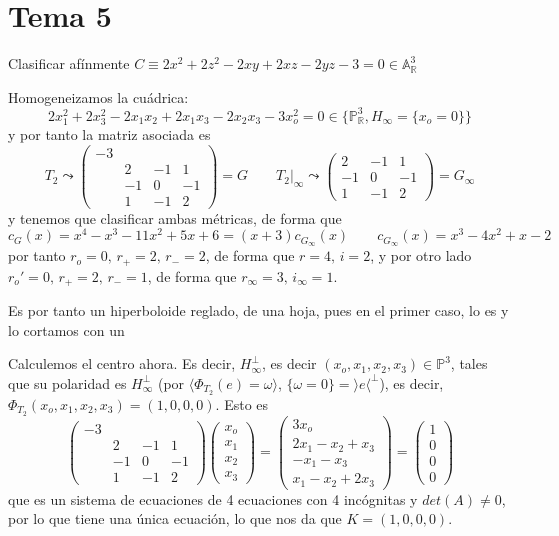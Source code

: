 \section{Tema 5}
\begin{ejer}
    Clasificar af\'inmente $C\equiv 2x^2+2z^2-2xy+2xz-2yz-3=0 \in \mathbb A^3_{\mathbb R}$ 
\end{ejer}
\begin{sol}
    Homogeneizamos la cu\'adrica:
    $$2x_1^2+2x_3^2-2x_1x_2+2x_1x_3-2x_2x_3-3x_o^2 = 0 \in \{ \mathbb P^3_{\mathbb R}, H_{\infty} = \{x_o=0\}\}$$
    y por tanto la matriz asociada es
    $$T_2 \leadsto \begin{pmatrix}
        -3  \\ & 2 & -1 & 1 \\ & -1 & 0 & -1 \\ & 1 & - 1 & 2 
    \end{pmatrix}=G \qquad T_2|_{\infty} \leadsto \begin{pmatrix}
        2 & -1 & 1 \\ -1 & 0 & -1 \\ 1 & - 1 & 2 
    \end{pmatrix}=G_{\infty}$$
    y tenemos que clasificar ambas m\'etricas, de forma que 
    $$c_G(x)=x^4-x^3-11x^2+5x+6=(x+3) c_{G_{\infty}}(x) \qquad c_{G_{\infty}}(x)=x^3-4x^2+x-2$$
    por tanto $r_o=0, \, r_+=2, \,r_-=2$, de forma que $r=4, \, i=2$, y por otro lado $r_o'=0, \, r_+=2,\, r_-=1$, de forma que $r_{\infty}=3, \, i_{\infty}=1$. 

    Es por tanto un hiperboloide reglado, de una hoja, pues en el primer caso, lo es y lo cortamos con un

    Calculemos el centro ahora. Es decir, $H_{\infty}^{\perp}$, es decir $(x_o,x_1,x_2,x_3) \in \mathbb P^3$, tales que su polaridad es $H_{\infty}^{\perp}$ (por $\langle \Phi_{T_2}(e) = \omega \rangle$, $\{\omega=0\} = \rangle e \langle^{\perp}$), es decir, $\Phi_{T_2}(x_o,x_1,x_2,x_3) =(1,0,0,0)$. Esto es
    $$\begin{pmatrix}
        -3  \\ & 2 & -1 & 1 \\ & -1 & 0 & -1 \\ & 1 & - 1 & 2 
    \end{pmatrix} \begin{pmatrix}
        x_o \\ x_1\\x_2\\x_3
    \end{pmatrix} = \begin{pmatrix}
        3x_o \\ 2x_1-x_2+x_3 \\ -x_1-x_3 \\ x_1-x_2+2x_3
    \end{pmatrix} = \begin{pmatrix}
        1\\0\\0\\0
    \end{pmatrix}$$
    que es un sistema de ecuaciones de 4 ecuaciones con 4 inc\'ognitas y $det(A)\neq 0$, por lo que tiene una \'unica ecuaci\'on, lo que nos da que $K=(1,0,0,0)$.


\end{sol}
